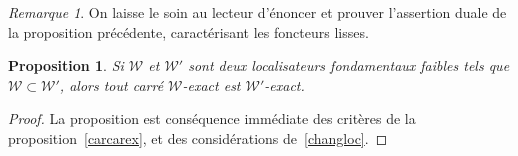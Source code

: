 \documentclass[francais]{smfart}
\theoremstyle{plain}
\newtheorem{prop}[thm]{Proposition}
\theoremstyle{remark}
\newtheorem{rem}[thm]{Remarque}
\theoremstyle{definition}
\numberwithin{equation}{thm}
\begin{document}
\begin{rem} \label{carlisseex}
On laisse le soin au lecteur d'énoncer et prouver l'assertion duale de la proposition précédente, caractérisant les foncteurs lisses.
\end{rem}

\begin{prop} \label{changloccarex}
Si ${\mathcal{W}}$ et ${\mathcal{W}}'$ sont deux localisateurs fondamentaux faibles tels que ${\mathcal{W}}\subset{\mathcal{W}}'$, alors tout carré ${\mathcal{W}}${\nobreakdash}-exact est ${\mathcal{W}}'${\nobreakdash}-exact.
\end{prop}

\begin{proof}
La proposition est conséquence immédiate des critères de la proposition~\ref{carcarex}, et des considérations de~\ref{changloc}.
\end{proof}
\end{document}
